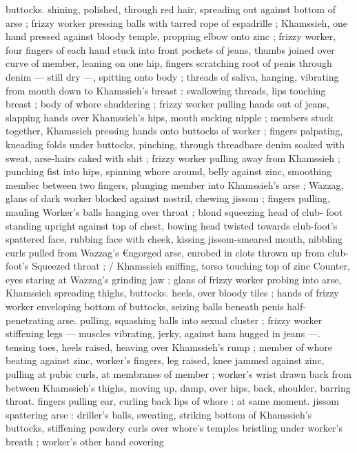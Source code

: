 buttocks. shining, polished, through red hair, spreading out against 
bottom of arse ; frizzy worker pressing balls with tarred rope of 
espadrille ; Khamssieh, one hand pressed against bloody temple, 
propping elbow onto zinc ; frizzy worker, four fingers of each hand 
stuck into front pockets of jeans, thumbs joined over curve of 
member, leaning on one hip, fingers scratching root of penis through 
denim --- still dry ---, spitting onto body ; threads of saliva, hanging, 
vibrating from mouth down to Khamssieh's breast : swallowing 
threads, lips touching breast ; body of whore shuddering ; frizzy 
worker pulling hands out of jeans, slapping hands over Khamssieh's 
hips, mouth sucking nipple ; members stuck together, Khamssieh 
pressing hands onto buttocks of worker ; fingers palpating, kneading 
folds under buttocks, pinching, through threadbare denim soaked 
with sweat, arse-hairs caked with shit ; frizzy worker pulling away 
from Khamssieh ; punching fist into hips, spinning whore around, 
belly against zinc, smoothing member between two fingers, plunging 
member into Khamssieh's arse ; Wazzag, glans of dark worker 
blocked against nostril, chewing jissom ; fingers pulling, mauling 
Worker's balls hanging over throat ; blond squeezing head of club- 
foot standing upright against top of chest, bowing head twisted 
towards club-foot's spattered face, rubbing face with cheek, kissing 
jissom-smeared mouth, nibbling curls pulled from Wazzag's 
€ngorged arse, enrobed in clots thrown up from club-foot's 
Squeezed throat ; {\slash} Khamssieh sniffing, torso touching top of zinc 
Counter, eyes staring at Wazzag's grinding jaw ; glans of frizzy 
worker probing into arse, Khamssieh spreading thighs, buttocks. 
heels, over bloody tiles ; hands of frizzy worker enveloping bottom 
of buttocks, seizing balls beneath penis half-penetrating arse. 
pulling, squashing balls into sexual cluster ; frizzy worker stiffening 
legs --- muscles vibrating, jerky, against ham hugged in jeans ---. 
tensing toes, heels raised, heaving over Khamssieh's rump ; member 
of whore beating against zinc, worker's fingers, leg raised, knee 
jammed against zinc, pulling at pubic curls, at membranes of 
member ; worker's wrist drawn back from between Khamssieh's 
thighs, moving up, damp, over hips, back, shoulder, barring throat. 
fingers pulling ear, curling back lips of whore : at same moment. 
jissom spattering arse : driller's balls, sweating, striking bottom of 
Khamssieh's buttocks, stiffening powdery curls over whore's temples 
bristling under worker's breath ; worker's other hand covering 
